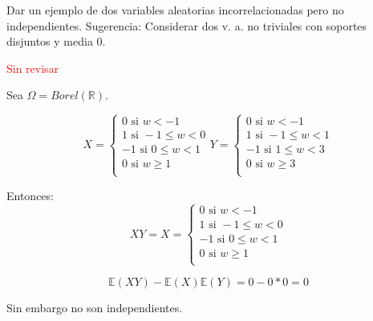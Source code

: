 
\begin{problem}[5]Dar un ejemplo de dos variables aleatorias incorrelacionadas pero no independientes.
Sugerencia: Considerar dos v. a. no triviales con soportes disjuntos y media 0.


\solution

\textcolor{red}{Sin revisar}

Sea $\Omega = Borel(\mathbb{R})$.

$$
X =
  \left\lbrace
  \begin{array}{l}
      0 \text{ si } w < -1\\
      1 \text{ si } -1 \leq w < 0\\
      -1 \text{ si } 0 \leq w < 1\\
      0 \text{ si } w \geq 1\\
  \end{array}
  \right.
Y =
  \left\lbrace
  \begin{array}{l}
      0 \text{ si } w < -1\\
      1 \text{ si } -1 \leq w < 1\\
      -1 \text{ si } 1 \leq w < 3\\
      0 \text{ si } w \geq 3\\
  \end{array}
  \right.
$$

Entonces:
$$
XY = X =
  \left\lbrace
  \begin{array}{l}
  	  0 \text{ si } w < -1\\
  	  1 \text{ si } -1 \leq w < 0\\
  	  -1 \text{ si } 0 \leq w < 1\\
  	  0 \text{ si } w \geq 1\\
  \end{array}
  \right.
$$

\[
\mathbb{E}(XY)-\mathbb{E}(X)\mathbb{E}(Y) = 0 - 0*0 = 0
\]

Sin embargo no son independientes.



\end{problem}


